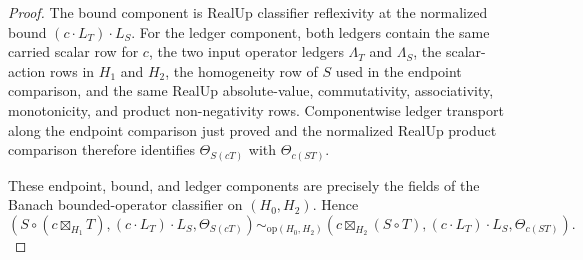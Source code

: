 \begin{proof}
The bound component is RealUp classifier reflexivity at the normalized bound
$(c\cdot L_T)\cdot L_S$. For the ledger component, both ledgers contain the
same carried scalar row for $c$, the two input operator ledgers $\Lambda_T$ and
$\Lambda_S$, the scalar-action rows in $H_1$ and $H_2$, the homogeneity row of
$S$ used in the endpoint comparison, and the same RealUp absolute-value,
commutativity, associativity, monotonicity, and product non-negativity rows.
Componentwise ledger transport along the endpoint comparison just proved and
the normalized RealUp product comparison therefore identifies
$\Theta_{S(cT)}$ with $\Theta_{c(ST)}$.

These endpoint, bound, and ledger components are precisely the fields of the
Banach bounded-operator classifier on $(H_0,H_2)$. Hence
$$
(S\circ(c\boxtimes_{H_1}T),(c\cdot L_T)\cdot L_S,\Theta_{S(cT)})
\sim_{\mathrm{op}(H_0,H_2)}
(c\boxtimes_{H_2}(S\circ T),(c\cdot L_T)\cdot L_S,\Theta_{c(ST)}).
$$
\end{proof}
